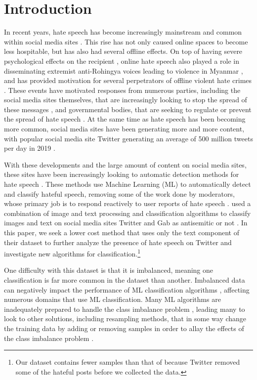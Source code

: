 \documentclass[runningheads]{llncs}
\begin{document}
\section{Introduction}
In recent years, hate speech has become increasingly mainstream and common within social media sites \cite{siegel}. This rise has not only caused online spaces to become less hospitable, but has also had several offline effects. On top of having severe psychological effects on the recipient \cite{siegel}, online hate speech also played a role in disseminating extremist anti-Rohingya voices leading to violence in Myanmar \cite{green}, and has provided motivation for several perpetrators of offline violent hate crimes \cite{siegel}. These events have motivated responses from numerous parties, including the social media sites themselves, that are increasingly looking to stop the spread of these messages \cite{ullmann}, and governmental bodies, that are seeking to regulate or prevent the spread of hate speech \cite{banks}. At the same time as hate speech has been becoming more common, social media sites have been generating more and more content, with popular social media site Twitter generating an average of 500 million tweets per day in 2019 \cite{pereira}.

With these developments and the large amount of content on social media sites, these sites have been increasingly looking to automatic detection methods for hate speech \cite{ullmann}. These methods use Machine Learning (ML) to automatically detect and classify hateful speech, removing some of the work done by moderators, whose primary job is to respond reactively to user reports of hate speech \cite{ullmann}. \cite{chandra} used a combination of image and text processing and classification algorithms to classify images and text on social media sites Twitter and Gab as antisemitic or not \cite{chandra}. In this paper, we seek a lower cost method that uses only the text component of their dataset to further analyze the presence of hate speech on Twitter and investigate new algorithms for classification.\footnote{Our dataset contains fewer samples than that of \cite{chandra} because Twitter removed some of the hateful posts before we collected the data.}

One difficulty with this dataset is that it is imbalanced, meaning one classification is far more common in the dataset than another. Imbalanced data can negatively impact the performance of ML classification algorithms \cite{sun}, affecting numerous domains that use ML classification. Many ML algorithms are inadequately prepared to handle the class imbalance problem \cite{sun}, leading many to look to other solutions, including resampling methods, that in some way change the training data by adding or removing samples in order to allay the effects of the class imbalance problem \cite{japkowicz}.
\end{document}
